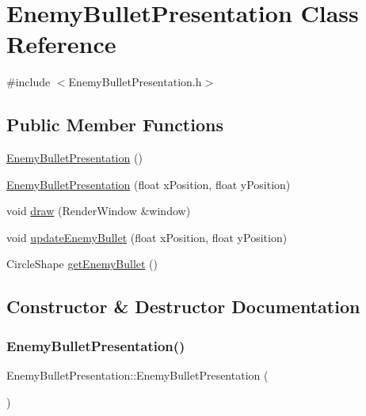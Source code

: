 \hypertarget{class_enemy_bullet_presentation}{}\section{Enemy\+Bullet\+Presentation Class Reference}
\label{class_enemy_bullet_presentation}


{\ttfamily \#include $<$Enemy\+Bullet\+Presentation.\+h$>$}

\subsection*{Public Member Functions}
\begin{DoxyCompactItemize}
\item 
\hyperlink{class_enemy_bullet_presentation_a9f2f47470f74f7c2f0df928ad3307e29}{Enemy\+Bullet\+Presentation} ()
\item 
\hyperlink{class_enemy_bullet_presentation_a650d6adb9afd73ec43d91791919e9797}{Enemy\+Bullet\+Presentation} (float x\+Position, float y\+Position)
\item 
void \hyperlink{class_enemy_bullet_presentation_ab47308a4c94cd9ee4c16f0b528a9c77b}{draw} (Render\+Window \&window)
\item 
void \hyperlink{class_enemy_bullet_presentation_a89cf545e80590e548f9f32dcce8edc98}{update\+Enemy\+Bullet} (float x\+Position, float y\+Position)
\item 
Circle\+Shape \hyperlink{class_enemy_bullet_presentation_a38b81cebcff8e858e6cbaf8df7a6fa23}{get\+Enemy\+Bullet} ()
\end{DoxyCompactItemize}


\subsection{Constructor \& Destructor Documentation}
\mbox{\label{class_enemy_bullet_presentation_a9f2f47470f74f7c2f0df928ad3307e29}} 
\subsubsection{\texorpdfstring{Enemy\+Bullet\+Presentation()}{EnemyBulletPresentation()}\hspace{0.1cm}{\footnotesize\ttfamily [1/2]}}
{\footnotesize\ttfamily Enemy\+Bullet\+Presentation\+::\+Enemy\+Bullet\+Presentation (\begin{DoxyParamCaption}{ }\end{DoxyParamCaption})}

